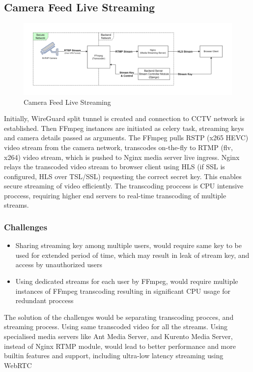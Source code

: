 	


\subsection{Camera Feed Live Streaming}
\begin{figure}[ht!]
	\centering
	\includegraphics[width=0.8\linewidth]{Images/live_stream_arch}
	\caption{Camera Feed Live Streaming}
	\label{fig:livestreamarch}
\end{figure}
Initially, WireGuard split tunnel is created and connection to CCTV network is established. Then FFmpeg instances are initiated as celery task, streaming keys and camera details passed as arguments. The FFmpeg pulls RSTP (x265 HEVC) video stream from the camera network, transcodes on-the-fly to RTMP (flv, x264) video stream, which is pushed to Nginx media server live ingress. Nginx relays the transcoded video stream to browser client using HLS (if SSL is configured, HLS over TSL/SSL) requesting the correct secret key. This enables secure streaming of video efficiently. The transcoding proccess is CPU intensive proccess, requiring higher end servers to real-time transcoding of multiple streams.

\subsubsection*{Challenges}
\begin{itemize}
	\item Sharing streaming key among multiple users, would require same key to be used for extended period of time, which may result in leak of stream key, and access by unauthorized users
	\item Using dedicated streams for each user by FFmpeg, would require multiple instances of FFmpeg transcoding resulting in significant CPU usage for redundant proccess
\end{itemize}
The solution of the challenges would be separating transcoding procces, and streaming process. Using same transcoded video for all the streams. Using specialised media servers like Ant Media Server, and Kurento Media Server, instead of Nginx RTMP module, would lead to better performance and more builtin features and support, including ultra-low latency streaming using WebRTC 

